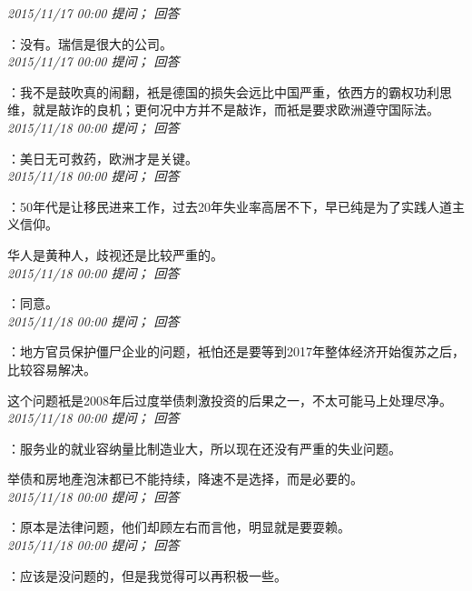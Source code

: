 \documentclass[twocolumn]{ctexart}
\begin{document}
\textit{\hfill\noindent\small 2015/11/17 00:00 提问； 回答}

：没有。瑞信是很大的公司。\\

\textit{\hfill\noindent\small 2015/11/17 00:00 提问； 回答}

：我不是鼓吹真的闹翻，衹是德国的损失会远比中国严重，依西方的霸权功利思维，就是敲诈的良机；更何况中方并不是敲诈，而衹是要求欧洲遵守国际法。\\

\textit{\hfill\noindent\small 2015/11/18 00:00 提问； 回答}

：美日无可救药，欧洲才是关键。\\

\textit{\hfill\noindent\small 2015/11/18 00:00 提问； 回答}

：50年代是让移民进来工作，过去20年失业率高居不下，早已纯是为了实践人道主义信仰。

华人是黄种人，歧视还是比较严重的。\\

\textit{\hfill\noindent\small 2015/11/18 00:00 提问； 回答}

：同意。\\

\textit{\hfill\noindent\small 2015/11/18 00:00 提问； 回答}

：地方官员保护僵尸企业的问题，衹怕还是要等到2017年整体经济开始復苏之后，比较容易解决。

这个问题衹是2008年后过度举债刺激投资的后果之一，不太可能马上处理尽净。\\

\textit{\hfill\noindent\small 2015/11/18 00:00 提问； 回答}

：服务业的就业容纳量比制造业大，所以现在还没有严重的失业问题。

举债和房地產泡沫都已不能持续，降速不是选择，而是必要的。\\

\textit{\hfill\noindent\small 2015/11/18 00:00 提问； 回答}

：原本是法律问题，他们却顾左右而言他，明显就是要耍赖。\\

\textit{\hfill\noindent\small 2015/11/18 00:00 提问； 回答}

：应该是没问题的，但是我觉得可以再积极一些。\\
\end{document}
